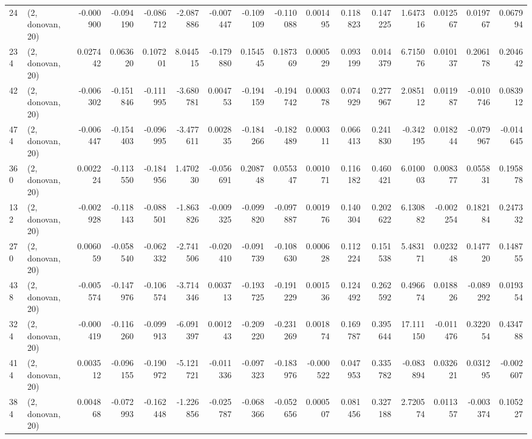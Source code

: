 \begin{tabular}{llrrrrrrrrrrrrrr}
24  &  (2, donovan, 20) &  -0.000900 & -0.094190 & -0.086712 &  -2.087886 & -0.007447 &  -0.109109 & -0.110088 &  0.001495 &  0.118823 &  0.147225 &     1.647316 &   0.012567 &   0.019767 &   0.067994 \\
234 &  (2, donovan, 20) &   0.027442 &  0.063620 &  0.107201 &   8.044515 & -0.179880 &   0.154545 &  0.187369 &  0.000529 &  0.093199 &  0.014379 &     6.715076 &   0.010137 &   0.206178 &   0.204642 \\
42  &  (2, donovan, 20) &  -0.006302 & -0.151846 & -0.111995 &  -3.680781 &  0.004753 &  -0.194159 & -0.194742 &  0.000378 &  0.074929 &  0.277967 &     2.085112 &   0.011987 &  -0.010746 &   0.083912 \\
474 &  (2, donovan, 20) &  -0.006447 & -0.154403 & -0.096995 &  -3.477611 &  0.002835 &  -0.184266 & -0.182489 &  0.000311 &  0.066413 &  0.241830 &    -0.342195 &   0.018244 &  -0.079967 &  -0.014645 \\
360 &  (2, donovan, 20) &   0.002224 & -0.113550 & -0.184956 &   1.470230 & -0.056691 &   0.208748 &  0.055347 &  0.001071 &  0.116182 &  0.460421 &     6.010003 &   0.008377 &   0.055831 &   0.195878 \\
132 &  (2, donovan, 20) &  -0.002928 & -0.118143 & -0.088501 &  -1.863826 & -0.009325 &  -0.099820 & -0.097887 &  0.001976 &  0.140304 &  0.202622 &     6.130882 &  -0.002254 &   0.182184 &   0.247332 \\
270 &  (2, donovan, 20) &   0.006059 & -0.058540 & -0.062332 &  -2.741506 & -0.020410 &  -0.091739 & -0.108630 &  0.000628 &  0.112224 &  0.151538 &     5.483171 &   0.023248 &   0.147720 &   0.148755 \\
438 &  (2, donovan, 20) &  -0.005574 & -0.147976 & -0.106574 &  -3.714346 &  0.003713 &  -0.193725 & -0.191229 &  0.001536 &  0.124492 &  0.262592 &     0.496674 &   0.018826 &  -0.089292 &   0.019354 \\
324 &  (2, donovan, 20) &  -0.000419 & -0.116260 & -0.099913 &  -6.091397 &  0.001243 &  -0.209220 & -0.231269 &  0.001874 &  0.169787 &  0.395644 &    17.111150 &  -0.011476 &   0.322054 &   0.434788 \\
414 &  (2, donovan, 20) &   0.003512 & -0.096155 & -0.190972 &  -5.121721 & -0.011336 &  -0.097323 & -0.183976 & -0.000522 &  0.047953 &  0.335782 &    -0.083894 &   0.032621 &   0.031295 &  -0.002607 \\
384 &  (2, donovan, 20) &   0.004868 & -0.072993 & -0.162448 &  -1.226856 & -0.025787 &  -0.068366 & -0.052656 &  0.000507 &  0.081456 &  0.327188 &     2.720574 &   0.011357 &  -0.003374 &   0.105227 \\

\end{tabular}
